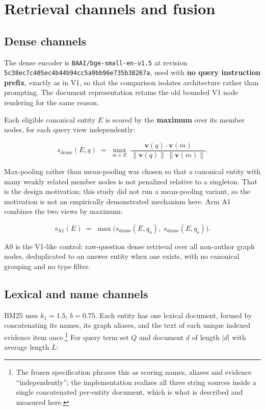 \documentclass[11pt,a4paper]{article}
\newcommand{\hx}[2]{\texttt{#1}\allowbreak\texttt{#2}}
\begin{document}
\section{Retrieval channels and fusion}

\subsection{Dense channels}

The dense encoder is \texttt{BAAI/bge-small-en-v1.5} at revision\\
\hx{5c38ec7c405ec4b44b94}{cc5a9bb96e735b38267a}, used with \textbf{no query instruction prefix}, exactly as
in V1, so that the comparison isolates architecture rather than prompting. The document representation
retains the old bounded V1 node rendering for the same reason.

Each eligible canonical entity $E$ is scored by the \textbf{maximum} over its member nodes, for each query
view independently:

\begin{equation}
s_{\text{dense}}(E, q) \;=\; \max_{m \in E} \; \frac{\mathbf{v}(q) \cdot \mathbf{v}(m)}{\lVert \mathbf{v}(q)\rVert \, \lVert \mathbf{v}(m)\rVert}.
\end{equation}

Max-pooling rather than mean-pooling was chosen so that a canonical entity with many weakly related member
nodes is not penalized relative to a singleton. That is the design motivation; this study did not run a
mean-pooling variant, so the motivation is not an empirically demonstrated mechanism here. Arm A1 combines
the two views by maximum:

\begin{equation}
s_{\text{A1}}(E) \;=\; \max\bigl(s_{\text{dense}}(E, q_{\text{o}}),\; s_{\text{dense}}(E, q_{\text{s}})\bigr).
\end{equation}

A0 is the V1-like control: raw-question dense retrieval over all non-author graph nodes, deduplicated to an
answer entity when one exists, with no canonical grouping and no type filter.

\subsection{Lexical and name channels}
\label{sec:lex}

BM25 uses $k_1 = 1.5$, $b = 0.75$. Each entity has one lexical document, formed by concatenating its names,
its graph aliases, and the text of each unique indexed evidence item once.\footnote{The frozen specification
phrases this as scoring names, aliases and evidence ``independently''; the implementation realizes all three
string sources inside a single concatenated per-entity document, which is what is described and measured
here.} For query term set $Q$ and document $d$ of length $|d|$ with average length $\overline{L}$:
\end{document}
